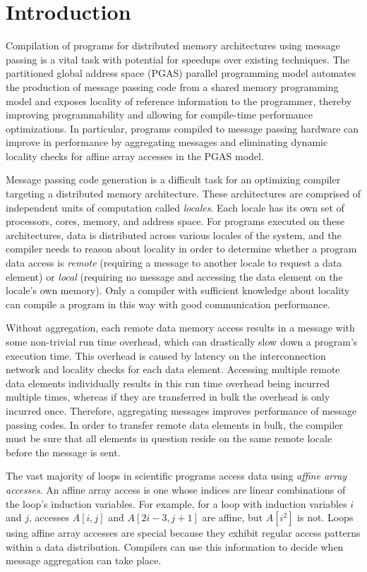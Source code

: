 \section{Introduction}\label{sec:intro} 

Compilation of programs for distributed memory architectures using message passing is a vital task with potential for speedups over existing techniques. The partitioned global address space (PGAS) parallel programming model automates the production of message passing code from a shared memory programming model and exposes locality of reference information to the programmer, thereby improving programmability and allowing for compile-time performance optimizations. In particular, programs compiled to message passing hardware can improve in performance by aggregating messages and eliminating dynamic locality checks for affine array accesses in the PGAS model. 

Message passing code generation is a difficult task for an optimizing compiler targeting a distributed memory architecture. These architectures are comprised of independent units of computation called \textit{locales}. Each locale has its own set of processors, cores, memory, and address space. For programs executed on these architectures, data is distributed across various locales of the system, and the compiler needs to reason about locality in order to determine whether a program data access is \textit{remote} (requiring a message to another locale to request a data element) or \textit{local} (requiring no message and accessing the data element on the locale's own memory). Only a compiler with sufficient knowledge about locality can compile a program in this way with good communication performance. 

Without aggregation, each remote data memory access results in a message with some non-trivial run time overhead, which can drastically slow down a program's execution time. This overhead is caused by latency on the interconnection network and locality checks for each data element. Accessing multiple remote data elements individually results in this run time overhead being incurred multiple times, whereas if they are transferred in bulk the overhead is only incurred once. Therefore, aggregating messages improves performance of message passing codes. In order to transfer remote data elements in bulk, the compiler must be sure that all elements in question reside on the same remote locale before the message is sent. 

The vast majority of loops in scientific programs access data using \textit{affine array accesses}. An affine array access is one whose indices are linear combinations of the loop's induction variables. For example, for a loop with induction variables $i$ and $j$, accesses $A[i, j]$ and $A[2i-3, j+1]$ are affine, but $A[i^2]$ is not. Loops using affine array accesses are special because they exhibit regular access patterns within a data distribution. Compilers can use this information to decide when message aggregation can take place. 

